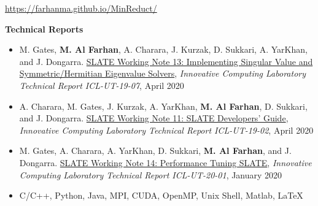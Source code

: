 \documentclass[9pt,a4paper]{extarticle}
\begin{document}
{\begin{itemize}
\url{https://farhanma.github.io/MinReduct/}\\
\end{itemize}

\textbf{Technical Reports}
\begin{itemize}
\item
M. Gates, \textbf{M. Al Farhan}, A. Charara, J. Kurzak, D. Sukkari, A. YarKhan, and J. Dongarra.
\href{http://www.icl.utk.edu/publications/swan-013}
{{SLATE Working Note 13: Implementing Singular Value and Symmetric/Hermitian Eigenvalue Solvers}},
\textit{Innovative Computing Laboratory Technical Report ICL-UT-19-07}, April 2020
\item
A. Charara, M. Gates, J. Kurzak, A. YarKhan,
\textbf{M. Al Farhan}, D. Sukkari, and J. Dongarra.
\href{http://www.icl.utk.edu/publications/swan-011}
{{SLATE Working Note 11: SLATE Developers' Guide}},
\textit{Innovative Computing Laboratory Technical Report ICL-UT-19-02}, April 2020
\item
M. Gates, A. Charara, A. YarKhan, D. Sukkari,
\textbf{M. Al Farhan}, and J. Dongarra.
\href{http://www.icl.utk.edu/publications/swan-014}
{{SLATE Working Note 14: Performance Tuning SLATE}},
\textit{Innovative Computing Laboratory Technical Report ICL-UT-20-01}, January 2020
\end{itemize}
}
\bigskip
\bigskip

{
\begin{itemize}
\item
C/C++, Python, Java, MPI, CUDA, OpenMP, Unix Shell, Matlab, \LaTeX
\end{itemize}
}
\bigskip
\bigskip

\end{document}
